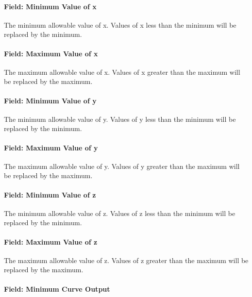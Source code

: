\paragraph{Field: Minimum Value of x}\label{field-minimum-value-of-x-11}

The minimum allowable value of x. Values of x less than the minimum will be replaced by the minimum.

\paragraph{Field: Maximum Value of x}\label{field-maximum-value-of-x-12}

The maximum allowable value of x. Values of x greater than the maximum will be replaced by the maximum.

\paragraph{Field: Minimum Value of y}\label{field-minimum-value-of-y-6}

The minimum allowable value of y. Values of y less than the minimum will be replaced by the minimum.

\paragraph{Field: Maximum Value of y}\label{field-maximum-value-of-y-6}

The maximum allowable value of y. Values of y greater than the maximum will be replaced by the maximum.

\paragraph{Field: Minimum Value of z}\label{field-minimum-value-of-z-2}

The minimum allowable value of z. Values of z less than the minimum will be replaced by the minimum.

\paragraph{Field: Maximum Value of z}\label{field-maximum-value-of-z-2}

The maximum allowable value of z. Values of z greater than the maximum will be replaced by the maximum.

\paragraph{Field: Minimum Curve Output}\label{field-minimum-curve-output-10}

